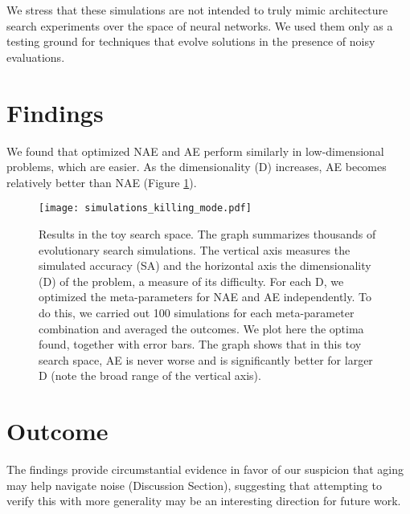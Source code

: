 \documentclass[letterpaper]{article} \usepackage{aaai19}  \usepackage{times}  \usepackage{helvet}  \usepackage{courier}  \usepackage{graphicx}  \frenchspacing
\begin{document}
We stress that these simulations are not intended to truly mimic architecture search experiments over the space of neural networks. We used them only as a testing ground for techniques that evolve solutions in the presence of noisy evaluations.


\section{Findings}


We found that optimized NAE and AE perform similarly in low-dimensional problems, which are easier. As the dimensionality (D) increases, AE becomes relatively better than NAE (Figure \ref{regularizing_sim_subfig}).

\begin{figure}[ht]
\centering
\texttt{[image: simulations\_killing\_mode.pdf]}
\caption{
Results in the toy search space. The graph summarizes thousands of evolutionary search simulations. The vertical axis measures the simulated accuracy (SA) and the horizontal axis the dimensionality (D) of the problem, a measure of its difficulty. For each D, we optimized the meta-parameters for NAE and AE independently. To do this, we carried out 100 simulations for each meta-parameter combination and averaged the outcomes. We plot here the optima found, together with  error bars. The graph shows that in this toy search space, AE is never worse and is significantly better for larger D (note the broad range of the vertical axis).
}
\label{regularizing_sim_subfig}
\end{figure}


\section{Outcome}


The findings provide circumstantial evidence in favor of our suspicion that aging may help navigate noise (Discussion Section), suggesting that attempting to verify this with more generality may be an interesting direction for future work.


\FloatBarrier
\clearpage
\renewcommand{\thesection}{D-\arabic{section}}
\renewcommand{\thefigure}{D-\arabic{figure}}
\setcounter{section}{0}
\setcounter{figure}{0}
\setcounter{table}{0}
\end{document}

